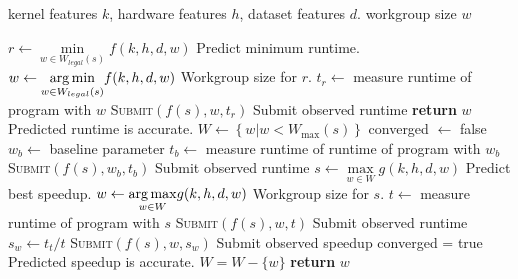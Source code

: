 \begin{algorithmic}[1]
\Require kernel features $k$, hardware features $h$, dataset features $d$.
\Ensure workgroup size $w$

\State $r \leftarrow \underset{w \in W_{legal}(s)}{\min} f(k,h,d,w)$
\Comment Predict minimum runtime.
\State $w \leftarrow \underset{w \in W_{legal}(s)}{\operatorname*{arg\,min}} f(k,h,d,w)$
\Comment Workgroup size for $r$.
\State $t_r \leftarrow$ measure runtime of program with $w$
\State \textsc{Submit}$\left( f(s), w, t_r \right)$
\Comment Submit observed runtime
  \State \textbf{return} $w$
\Comment Predicted runtime is accurate.
\Else
   \State $W \leftarrow \left\{ w | w < W_{\max}(s) \right\}$
   \State converged $\leftarrow$ false
   \State $w_b \leftarrow$ baseline parameter
   \State $t_b \leftarrow$ measure runtime of runtime of program with
   $w_b$
   \State \textsc{Submit}$\left( f(s), w_b, t_b \right)$
   \Comment Submit observed runtime
     \State $s \leftarrow \underset{w \in W}{\max} g(k,h,d,w)$
     \Comment Predict best speedup.
     \State $w \leftarrow \underset{w \in W}{\operatorname*{arg\,max}} g(k,h,d,w)$
     \Comment Workgroup size for $s$.
     \State $t \leftarrow$ measure runtime of program with $s$
     \State \textsc{Submit}$\left( f(s), w, t \right)$
     \Comment Submit observed runtime
     \State $s_w \leftarrow t_t / t$
     \State \textsc{Submit}$\left( f(s), w, s_w \right)$
     \Comment Submit observed speedup
       \State converged = true
       \Comment Predicted speedup is accurate.
     \Else
       \State $W = W - \{ w \}$
     \EndIf
   \EndWhile
   \State \textbf{return} $w$
\EndIf
\end{algorithmic}
